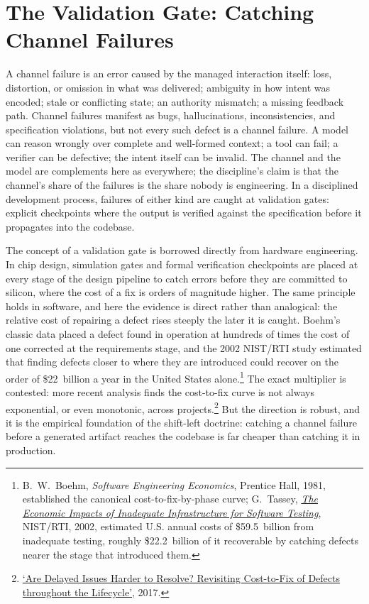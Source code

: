 \documentclass[11pt, a4paper]{article}
\begin{document}
\section{The Validation Gate: Catching Channel Failures}

A channel failure is an error caused by the managed interaction itself: loss, distortion,
or omission in what was delivered; ambiguity in how intent was encoded; stale or
conflicting state; an authority mismatch; a missing feedback path. Channel failures
manifest as bugs, hallucinations, inconsistencies, and specification violations, but not
every such defect is a channel failure. A model can reason wrongly over complete and
well-formed context; a tool can fail; a verifier can be defective; the intent itself can
be invalid. The channel and the model are complements here as everywhere; the
discipline's claim is that the channel's share of the failures is the share nobody is
engineering. In a disciplined development process, failures of either kind are caught at
validation gates: explicit checkpoints where the output is verified against the
specification before it propagates into the codebase.

The concept of a validation gate is borrowed directly from hardware engineering. In chip
design, simulation gates and formal verification checkpoints are placed at every stage of
the design pipeline to catch errors before they are committed to silicon, where the cost
of a fix is orders of magnitude higher. The same principle holds in software, and here the
evidence is direct rather than analogical: the relative cost of repairing a defect rises
steeply the later it is caught. Boehm's classic data placed a defect found in operation at
hundreds of times the cost of one corrected at the requirements stage, and the 2002
NIST/RTI study estimated that finding defects closer to where they are introduced could
recover on the order of \$22~billion a year in the United States
alone.\footnote{B.~W.~Boehm, \emph{Software Engineering Economics}, Prentice Hall, 1981,
established the canonical cost-to-fix-by-phase curve; G.~Tassey,
\href{https://www.nist.gov/system/files/documents/director/planning/report02-3.pdf}{\emph{The
Economic Impacts of Inadequate Infrastructure for Software Testing}}, NIST/RTI, 2002,
estimated U.S. annual costs of \$59.5~billion from inadequate testing, roughly
\$22.2~billion of it recoverable by catching defects nearer the stage that introduced
them.} The exact multiplier is contested: more recent analysis finds the cost-to-fix
curve is not always exponential, or even monotonic, across
projects.\footnote{\href{https://arxiv.org/abs/1609.04886}{`Are Delayed Issues Harder to
Resolve? Revisiting Cost-to-Fix of Defects throughout the Lifecycle'}, 2017.} But the
direction is robust, and it is the empirical foundation of the shift-left doctrine:
catching a channel failure before a generated artifact reaches the codebase is far cheaper
than catching it in production.
\end{document}
